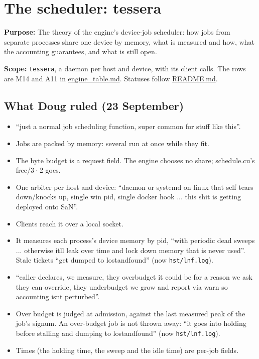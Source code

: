 \chapter{\texorpdfstring{The scheduler: tessera}{The scheduler: tessera}}
\label{chap:tessera-scheduler}

\textbf{Purpose:} The theory of the engine's device-job scheduler: how jobs from separate processes share one device by memory, what is measured and how, what the accounting guarantees, and what is still open.

\textbf{Scope:} \texttt{tessera}, a daemon per host and device, with its client calls. The rows are M14 and A11 in \hyperref[chap:engine-table]{engine\_\allowbreak{}table.md}. Statuses follow \hyperref[chap:readme]{README.md}.

\section{\texorpdfstring{What Doug ruled (23 September)}{What Doug ruled (23 September)}}

\begin{itemize}
\item “just a normal job scheduling function, super common for stuff like this”.
\item Jobs are packed by memory: several run at once while they fit.
\item The byte budget is a request field. The engine chooses no share; schedule.cu's free/3·2 goes.
\item One arbiter per host and device: “daemon or systemd on linux that self tears down/knocks up, single win pid, single docker hook ... this shit is getting deployed onto SaN”.
\item Clients reach it over a local socket.
\item It measures each process's device memory by pid, “with periodic dead sweeps ... otherwise itll leak over time and lock down memory that is never used”. Stale tickets “get dumped to lostandfound” (now \texttt{hst/\allowbreak{}lnf.\allowbreak{}log}).
\item “caller declares, we measure, they overbudget it could be for a reason we ask they can override, they underbudget we grow and report via warn so accounting isnt perturbed”.
\item Over budget is judged at admission, against the last measured peak of the job's signum. An over-budget job is not thrown away: “it goes into holding before stalling and dumping to lostandfound” (now \texttt{hst/\allowbreak{}lnf.\allowbreak{}log}).
\item Times (the holding time, the sweep and the idle time) are per-job fields.
\end{itemize}

